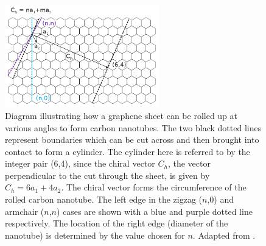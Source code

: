 \documentclass[
  a4paper,
]{scrbook}
\begin{document}
\begin{figure}

{\centering \includegraphics[width=0.6\textwidth,height=\textheight]{figures/ch2/carbon_nanotube_wrapping.png}

}

\caption{\label{fig-carbon-nanotube-wrapping}Diagram illustrating how a
graphene sheet can be rolled up at various angles to form carbon
nanotubes. The two black dotted lines represent boundaries which can be
cut across and then brought into contact to form a cylinder. The
cylinder here is referred to by the integer pair (6,4), since the chiral
vector \(C_h\), the vector perpendicular to the cut through the sheet,
is given by \(C_h = 6a_1+4a_2\). The chiral vector forms the
circumference of the rolled carbon nanotube. The left edge in the zigzag
(\(n\),0) and armchair (\(n\),\(n\)) cases are shown with a blue and
purple dotted line respectively. The location of the right edge
(diameter of the nanotube) is determined by the value chosen for \(n\).
Adapted from \autocite{Dekker1999,Lu2012}.}

\end{figure}
\end{document}

